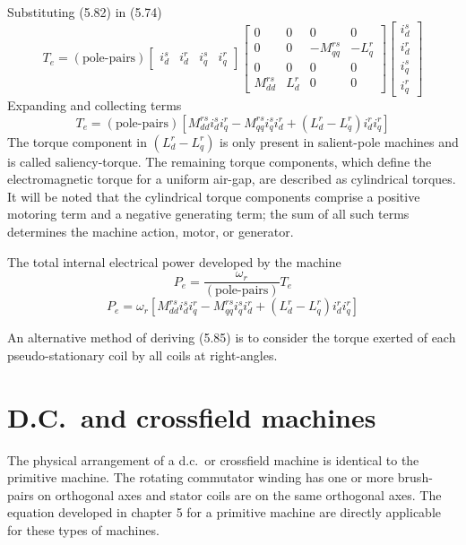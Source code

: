 \documentclass[a4paper,numbers=noenddot,12pt]{scrbook}
\begin{document}
        Substituting (5.82) in (5.74)
        \begin{equation}
            T_e = (\text{pole-pairs})
            \begin{bmatrix}
                i_d^s & i_d^r &i_q^s & i_q^r
            \end{bmatrix}
            \begin{bmatrix}
                0 & 0 & 0 & 0 \\
                0 & 0 & -M_{qq}^{rs} & -L_q^r \\
                0 & 0 & 0 & 0 \\
                M_{dd}^{rs} & L_d^r & 0 & 0 
            \end{bmatrix}
            \begin{bmatrix}
                i_d^s \\  i_d^r \\ i_q^s \\ i_q^r
            \end{bmatrix}
        \end{equation}
        Expanding and collecting terms
        \begin{equation}
            T_e = (\text{pole-pairs}) [M_{dd}^{rs} i_d^s i_q^r - M_{qq}^{rs} i_q^s i_d^r + (L_d^r  - L_q^r)i_d^r i_q^r]
        \end{equation}
        The torque component in $(L_d^r - L_q^r)$ is only present in salient-pole machines and is called saliency-torque. The remaining torque components, which define the electromagnetic torque for a uniform air-gap, are described as cylindrical torques. It will be noted that the cylindrical torque components comprise a positive motoring term and a negative generating term; the sum of all such terms determines the machine action, motor, or generator.

        The total internal electrical power developed by the machine
        \begin{equation}
            P_e = \frac{\omega_r}{(\text{pole-pairs})} T_e
        \end{equation}
        \begin{equation}
            P_e = \omega_r [M_{dd}^{rs} i_d^s i_q^r - M_{qq}^{rs} i_q^s i_d^r + (L_d^r  - L_q^r)i_d^r i_q^r]
        \end{equation}

        An alternative method of deriving (5.85) is to consider the torque exerted of each pseudo-stationary coil by all coils at right-angles.
        \chapter{D.C.\ and crossfield machines}
        The physical arrangement of a d.c.\ or crossfield machine is identical to the primitive machine. The rotating commutator winding has one or more brush-pairs on orthogonal axes and stator coils are on the same orthogonal axes. The equation developed in chapter 5 for a primitive machine are directly applicable for these types of machines.
\end{document}
